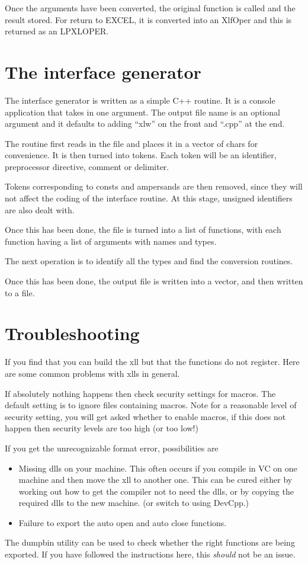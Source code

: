 \documentclass[12pt,reqno]{amsart}
\numberwithin{equation}{section}
\numberwithin{figure}{section}
\begin{document}
Once the arguments have been converted, the original function is
called and the result stored. For return to EXCEL, it is converted
into an XlfOper and this is returned as an LPXLOPER.

 
\section{The interface generator}

The interface generator is written as a simple C++ routine. It is a
console application that takes in one argument. The output file name
is an optional argument and it defaults to adding ``xlw'' on the front
and ``.cpp'' at the end.

The routine first reads in the file and places it in a vector of chars
for convenience. It is then turned into tokens. Each token will be an
identifier, preprocessor directive,  comment or delimiter. 

Tokens corresponding to consts and ampersands are then removed, since
they will not affect the coding of the interface routine. At this
stage, unsigned identifiers are also dealt with. 

Once this has been done, the file is turned into a list of functions,
with each function having a list of arguments with names and types.

The next operation is to identify all the types and find the
conversion routines. 

Once this has been done, the output file is written into a vector, and
then written to a file. 


\section{Troubleshooting}

 If you find that you can build the xll but that the functions do not
register. Here are some common problems with xlls in general. 

If absolutely nothing happens then check security settings for
macros. The default setting is to ignore files containing macros. Note
for a reasonable level of security setting, you will get asked whether
to enable macros, if this does not happen then security levels are too
high (or too low!)

If you get the unrecognizable format error, possibilities are

\begin{itemize}
\item Missing dlls on your machine. This often occurs if you compile
  in VC on one machine and then move the xll to another one. This can
  be cured either by working out how to get the compiler not to need
  the dlls, or by copying the required dlls to the new machine. (or
  switch to using DevCpp.) 
\item Failure to export the auto open and auto close functions. 
\end{itemize}

The dumpbin utility can be used to check whether the right functions
are being exported. If you have followed the instructions here, this
{\em should} not be an issue.
\end{document}
